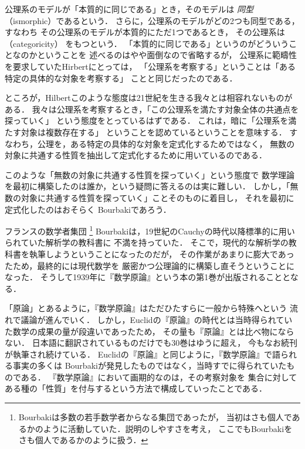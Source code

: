   公理系のモデルが「本質的に同じである」とき，そのモデルは
  \emph{同型}（ismorphic）であるという．
  さらに，公理系のモデルがどの2つも同型である，すなわち
  その公理系のモデルが本質的にただ1つであるとき，
  その公理系は
  \emph{}（categoricity）
  をもつという．
  「本質的に同じである」というのがどういうことなのかということを
  述べるのはやや面倒なので省略するが，
  公理系に範疇性を要求していたHirbertにとっては，
  「公理系を考察する」ということは「ある特定の具体的な対象を考察する」
  ことと同じだったのである．

  ところが，Hilbertこのような態度は21世紀を生きる我々とは相容れないものがある．
  我々は公理系を考察するとき，「この公理系を満たす対象全体の共通点を探っていく」
  という態度をとっているはずである．
  これは，暗に「公理系を満たす対象は複数存在する」
  ということを認めているということを意味する．
  すなわち，公理を，ある特定の具体的な対象を定式化するためではなく，
  無数の対象に共通する性質を抽出して定式化するために用いているのである．
  
  このような「無数の対象に共通する性質を探っていく」という態度で
  数学理論を最初に構築したのは誰か，という疑問に答えるのは実に難しい．
  しかし，「無数の対象に共通する性質を探っていく」ことそのものに着目し，
  それを最初に定式化したのはおそらく
  Bourbakiであろう．

  フランスの数学者集団
  \footnote{Bourbakiは多数の若手数学者からなる集団であったが，
    当初はさも個人であるかのように活動していた．説明のしやすさを考え，
    ここでもBourbakiをさも個人であるかのように扱う．}
  Bourbakiは，19世紀のCauchyの時代以降標準的に用いられていた解析学の教科書に
  不満を持っていた．
  そこで，現代的な解析学の教科書を執筆しようということになったのだが，
  その作業があまりに膨大であったため，最終的には現代数学を
  厳密かつ公理論的に構築し直そうということになった．
  そうして1939年に『数学原論』という本の第1巻が出版されることとなる．

  「原論」とあるように，『数学原論』はただひたすらに一般から特殊へという
  流れで議論が進んでいく．
  しかし，Euclidの『原論』の時代とは当時得られていた数学の成果の量が段違いであったため，
  その量も『原論』とは比べ物にならない．
  日本語に翻訳されているものだけでも30巻はゆうに超え，
  今もなお続刊が執筆され続けている．
  Euclidの『原論』と同じように，『数学原論』で語られる事実の多くは
  Bourbakiが発見したものではなく，当時すでに得られていたものである．
  『数学原論』において画期的なのは，その考察対象を
  集合に対してある種の「性質」を付与するという方法で構成していったことである．


